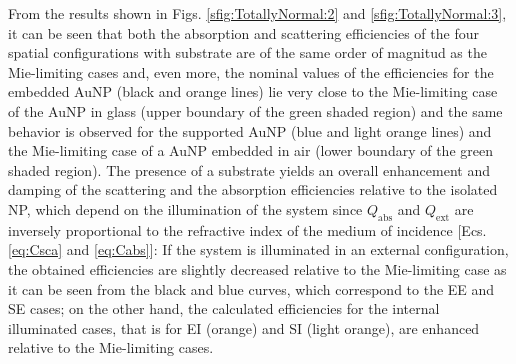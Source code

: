 From the results shown in Figs. \ref{sfig:TotallyNormal:2} and \ref{sfig:TotallyNormal:3}, it can be seen that both the absorption and scattering efficiencies of the four spatial configurations with substrate are of the same order of magnitud as the Mie-limiting cases and, even more, the nominal values of the efficiencies for the embedded AuNP (black and orange lines) lie very close to the Mie-limiting case of the AuNP in glass (upper boundary of the green shaded region) and the same behavior is observed for the supported AuNP (blue and light orange lines) and the Mie-limiting case of a AuNP embedded in air (lower boundary of the green shaded region). The presence of a substrate yields an overall enhancement and damping of the scattering and the absorption efficiencies relative to the isolated NP, which depend on the illumination of the system since $Q_\text{abs}$ and $Q_\text{ext}$ are inversely proportional to the refractive index of the medium of incidence [Ecs. \eqref{eq:Csca} and \eqref{eq:Cabs}]: If the system is illuminated in an external configuration, the obtained efficiencies are slightly decreased relative to the Mie-limiting case as it can be seen from the black  and blue curves, which correspond to the EE and SE cases; on the other hand, the calculated efficiencies for the internal illuminated cases, that is for EI (orange) and SI (light orange), are enhanced relative to the Mie-limiting cases.

